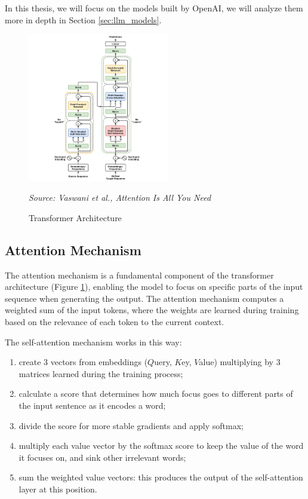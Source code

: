 In this thesis, we will focus on the models built by OpenAI, we will analyze
them more in depth in Section \ref{sec:llm_models}.

\begin{figure}[ht!]
  \centering
  \includegraphics[width=0.55\textwidth]{
    images/background/transformer_architecture.png
  }
  \caption{Transformer Architecture}
  {\emph{Source: Vaswani et al., Attention Is All You Need \cite{vaswani2023attentionneed}}}
  \label{fig:transformer_architecture}
\end{figure}

\subsection{Attention Mechanism}
\label{sub:attention_mechanism}

The attention mechanism is a fundamental component of the transformer
architecture (Figure \ref{fig:transformer_architecture}), enabling the model to focus
on specific parts of the input sequence when generating the output. The
attention mechanism computes a weighted sum of the input tokens, where the weights
are learned during training based on the relevance of each token to the current context.

The self-attention mechanism works in this way:
\begin{enumerate}
  \item create 3 vectors from embeddings ($Q$uery, $K$ey, $V$alue) multiplying
    by 3 matrices learned during the training process;

  \item calculate a score that determines how much focus goes to different parts
    of the input sentence as it encodes a word;

  \item divide the score for more stable gradients and apply softmax;

  \item multiply each value vector by the softmax score to keep the value of the
    word it focuses on, and sink other irrelevant words;

  \item sum the weighted value vectors: this produces the output of the self-attention
    layer at this position.
\end{enumerate}

